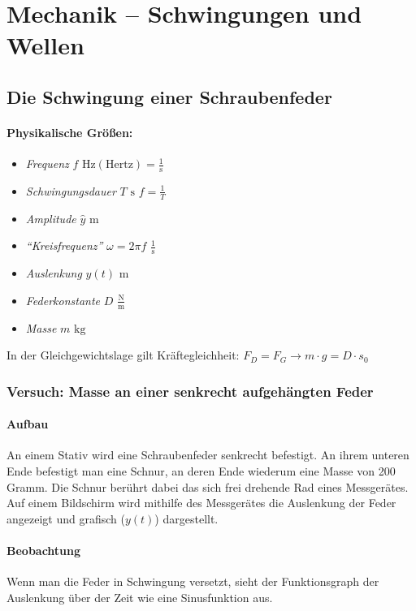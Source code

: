 \documentclass[a4paper]{scrartcl}
\begin{document}
\section{Mechanik -- Schwingungen und Wellen}
\subsection{Die Schwingung einer Schraubenfeder}
\paragraph{Physikalische Größen:} \begin{itemize}
	\item \emph{Frequenz} $f$ $\mathrm{Hz (Hertz)} = \frac{1}{\mathrm{s}}$
	\item \emph{Schwingungsdauer} $T$ $\mathrm{s}$ $f = \frac{1}{T}$
	\item \emph{Amplitude} $\hat{y}$ $\mathrm{m}$
	\item \emph{"`Kreisfrequenz"'} $\omega = 2 \pi f$ $\frac{1}{\mathrm{s}}$
	\item \emph{Auslenkung} $y(t)$ $\mathrm{m}$
	\item \emph{Federkonstante} $D$ $\frac{\mathrm{N}}{\mathrm{m}}$
	\item \emph{Masse} $m$ $\mathrm{kg}$
\end{itemize}
In der Gleichgewichtslage gilt Kräftegleichheit: $F_D = F_G \rightarrow m \cdot
g = D \cdot s_0$

\subsubsection{Versuch: Masse an einer senkrecht aufgehängten Feder}
\paragraph{Aufbau}
An einem Stativ wird eine Schraubenfeder senkrecht befestigt. An ihrem unteren
Ende befestigt man eine Schnur, an deren Ende wiederum eine Masse von 200
Gramm. Die Schnur berührt dabei das sich frei drehende Rad eines Messgerätes.
Auf einem Bildschirm wird mithilfe des Messgerätes die Auslenkung der Feder
angezeigt und grafisch (\(y(t)\)) dargestellt.
\paragraph{Beobachtung}
Wenn man die Feder in Schwingung versetzt, sieht der Funktionsgraph der
Auslenkung über der Zeit wie eine Sinusfunktion aus.
\end{document}
